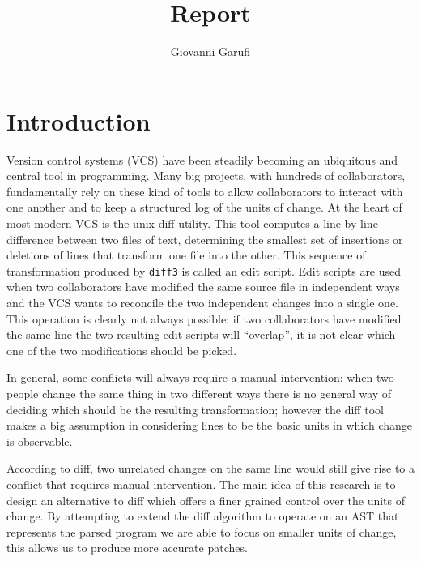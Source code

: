 \documentclass[11pt]{article}
\title{Report}
\author{Giovanni Garufi}
\date{}
\begin{document}
\maketitle

\section{Introduction}
Version control systems (VCS) have been steadily becoming an ubiquitous and central 
tool in programming. Many big projects, with hundreds of collaborators, 
fundamentally rely on these kind of tools to allow collaborators to interact 
with one another and to keep a structured log of the units of change. 
At the heart of most modern VCS is the unix diff utility. This tool computes a 
line-by-line difference between two files of text, determining the smallest set 
of insertions or deletions of lines that transform one file into the other. This sequence of transformation 
produced by \texttt{diff3} is called an edit script. 
Edit scripts are used when two collaborators have modified the same source file in independent 
ways and the VCS wants to reconcile the two independent changes into a single 
one. This operation is clearly not always possible: if two collaborators have 
modified the same line the two resulting edit scripts will 
``overlap'', it is not clear which one of the two modifications should be 
picked.  

In general, some conflicts will always require a manual intervention: when two 
people change the same thing in two different ways there is no general way of 
deciding which should be the resulting transformation; however the diff tool makes 
a big assumption in considering lines to be the basic units in which change is 
observable.  

According to diff, two unrelated changes on the same line would still give rise to a 
conflict that requires manual intervention. 
The main idea of this research is to design an alternative to diff which offers a 
finer grained control over the units of change. By attempting to extend the diff algorithm to operate on an AST that 
represents the parsed program we are able to focus on smaller units of change, this allows us to produce 
more accurate patches. 
\end{document}
